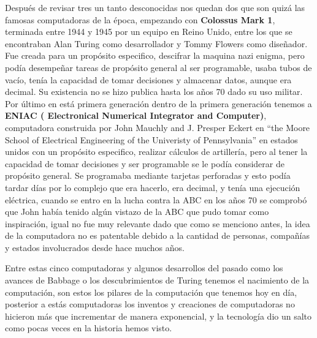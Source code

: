 \documentclass[letterpaper,12pt,oneside]{book}
\begin{document}
		Después de revisar tres un tanto desconocidas nos quedan dos que son quizá las famosas computadoras de la época, empezando con 
		\textbf{Colossus Mark 1}, terminada entre 1944 y 1945 por un equipo en Reino Unido, entre los que se encontraban Alan Turing como desarrollador
		y Tommy Flowers como diseñador. Fue creada para un propósito especifico, descifrar la maquina nazi enigma, pero podía desempeñar tareas de propósito
		general al ser programable, usaba tubos de vacío, tenía la capacidad de tomar decisiones y almacenar datos, aunque era decimal. Su existencia no
		se hizo publica hasta los años 70 dado su uso militar. Por último en está primera generación dentro de la primera generación tenemos a
		\textbf{ENIAC ( Electronical Numerical Integrator and Computer)}, computadora construida por John Mauchly and J. Presper Eckert en ``the Moore School of
		Electrical Engineering of the Univeristy of Pennsylvania'' en estados unidos con un propósito especifico, realizar cálculos de artillería, pero al
		tener la capacidad de tomar decisiones y ser programable se le podía considerar de propósito general. Se programaba mediante tarjetas perforadas
		y esto podía tardar días por lo complejo que era hacerlo, era decimal, y tenía una ejecución eléctrica, cuando se entro en la lucha contra la ABC en
		los años 70 se comprobó que John había tenido algún vistazo de la ABC que pudo tomar como inspiración, igual no fue muy relevante dado que como
		se menciono antes, la idea de la computadora no es patentable debido a la cantidad de personas, compañías y estados involucrados desde
		hace muchos años.
		
		
		Entre estas cinco computadoras y algunos desarrollos del pasado como los avances de Babbage o los descubrimientos de Turing tenemos el
		nacimiento de la computación, son estos los pilares de la computación que tenemos hoy en día, posterior a estás computadoras
		los inventos y creaciones de computadoras no hicieron más que incrementar de manera exponencial, y la tecnología dio un
		salto como pocas veces en la historia hemos visto.
\end{document}
